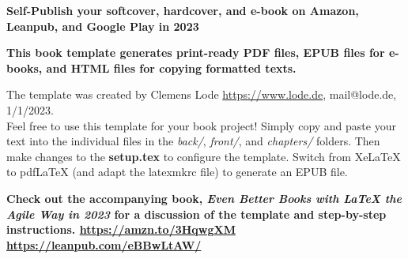 

\thispagestyle{empty}

\begin{center}

    {\bfseries \sffamily \Huge Self-Publish your softcover, hardcover, and e-book on Amazon, Leanpub, and Google Play in 2023\par
    \bfseries \LARGE This book template generates print-ready PDF files, EPUB files for e-books, and HTML files for copying formatted texts.\par}
    
    \sffamily The template was created by Clemens Lode \url{https://www.lode.de}, mail@lode.de, 1/1/2023.\\
    Feel free to use this template for your book project! Simply copy and paste your text into the individual files in the \textit{back/}, \textit{front/}, and \textit{chapters/} folders. Then make changes to the \textbf{setup.tex} to configure the template. Switch from XeLaTeX to pdfLaTeX (and adapt the latexmkrc file) to generate an EPUB file.\par
    
    \bfseries \LARGE Check out the accompanying book, {\color{red} \textit{Even Better Books with LaTeX the Agile Way in 2023}} for a discussion of the template and step-by-step instructions. {\color{red} \url{https://amzn.to/3HqwgXM} \url{https://leanpub.com/eBBwLtAW/}}\par
\end{center}